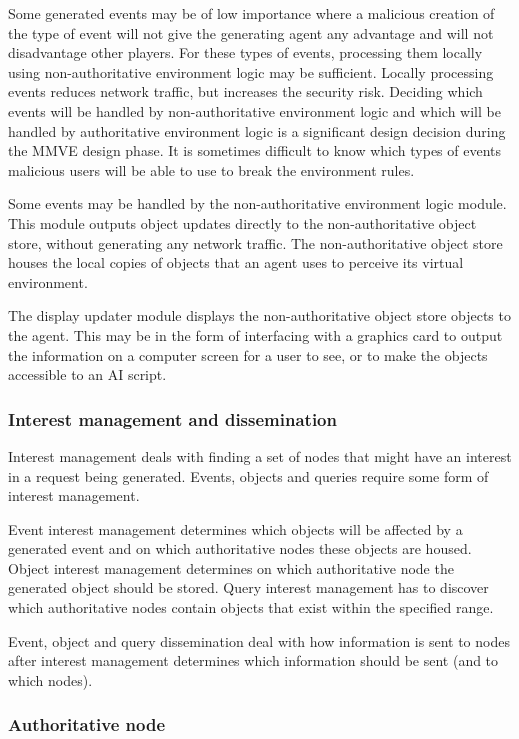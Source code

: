 Some generated events may be of low importance where a malicious creation of the type of event will not give the generating agent any advantage and will not disadvantage other players. For these types of events, processing them locally using non-authoritative environment logic may be sufficient. Locally processing events reduces network traffic, but increases the security risk. Deciding which events will be handled by non-authoritative environment logic and which will be handled by authoritative environment logic is a significant design decision during the MMVE design phase. It is sometimes difficult to know which types of events malicious users will be able to use to break the environment rules.

Some events may be handled by the non-authoritative environment logic module. This module outputs object updates directly to the non-authoritative object store, without generating any network traffic. The non-authoritative object store houses the local copies of objects that an agent uses to perceive its virtual environment.

The display updater module displays the non-authoritative object store objects to the agent. This may be in the form of interfacing with a graphics card to output the information on a computer screen for a user to see, or to make the objects accessible to an AI script.

\subsubsection{Interest management and dissemination}

Interest management deals with finding a set of nodes that might have an interest in a request being generated. Events, objects and queries require some form of interest management.

Event interest management determines which objects will be affected by a generated event and on which authoritative nodes these objects are housed. Object interest management determines on which authoritative node the generated object should be stored. Query interest management has to discover which authoritative nodes contain objects that exist within the specified range.

Event, object and query dissemination deal with how information is sent to nodes after interest management determines which information should be sent (and to which nodes).

\subsubsection{Authoritative node}

